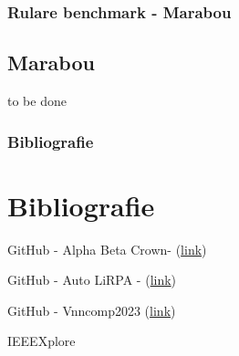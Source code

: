 \documentclass{beamer}
\begin{document}
\begin{frame}

\frametitle{Rulare benchmark - Marabou}
\subsection{Marabou}
to be done
\end{frame}

\begin{frame}

\frametitle{Bibliografie}
\section{Bibliografie}
\begin{thebibliography}{10}
GitHub - Alpha Beta Crown- (\href{https://github.com/Verified-Intelligence/alpha-beta-CROWN}{link})\label{1}

GitHub - Auto LiRPA -  (\href{https://github.com/Verified-Intelligence/auto_LiRPA}{link}) \label{2}

GitHub - Vnncomp2023 (\href{https://github.com/ChristopherBrix/vnncomp2023\_benchmarks}{link})\label{3}

IEEEXplore \label{4}

\end{thebibliography}
\end{frame}
\end{document}

